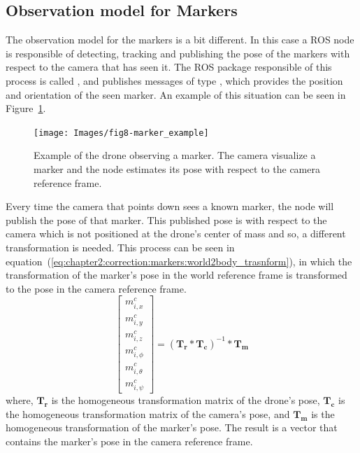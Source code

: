 \subsection{Observation model for Markers}
\label{subsec:chapter2:correction:markers}

The observation model for the markers is a bit different. In this case a ROS node is responsible of detecting, tracking and publishing the pose of the markers with respect to the camera that has seen it. The ROS package responsible of this process is called , and publishes messages of type , which provides the position and orientation of the seen marker. An example of this situation can be seen in Figure~\ref{fig:chapter2:correction:markers:example}.\\

\begin{figure}
    \centering
    \texttt{[image: Images/fig8-marker\_example]}
    \caption[Example of the drone observing a marker]{Example of the drone observing a marker. The camera visualize a marker and the node  estimates its pose with respect to the camera reference frame.}
    \label{fig:chapter2:correction:markers:example}
\end{figure}

Every time the camera that points down sees a known marker, the  node will publish the pose of that marker. This published pose is with respect to the camera which is not positioned at the drone's center of mass and so, a different transformation is needed. This process can be seen in equation~(\ref{eq:chapter2:correction:markers:world2body_trasnform}), in which the transformation of the marker's pose in the world reference frame is transformed to the pose in the camera reference frame.
\begin{equation}
    \begin{bmatrix}
        m_{i, x}^c \\ m_{i, y}^c \\ m_{i, z}^c \\ m_{i, \phi}^c \\ m_{i, \theta}^c \\ m_{i, \psi}^c
    \end{bmatrix} = (\bm{T_r} * \bm{T_c})^{-1} * \bm{T_m}
    \label{eq:chapter2:correction:markers:world2body_trasnform}
\end{equation}
where, $\bm{T_r}$ is the homogeneous transformation matrix of the drone's pose, $\bm{T_c}$ is the homogeneous transformation matrix of the camera's pose, and $\bm{T_m}$ is the homogeneous transformation of the marker's pose. The result is a vector that contains the marker's pose in the camera reference frame.\\

